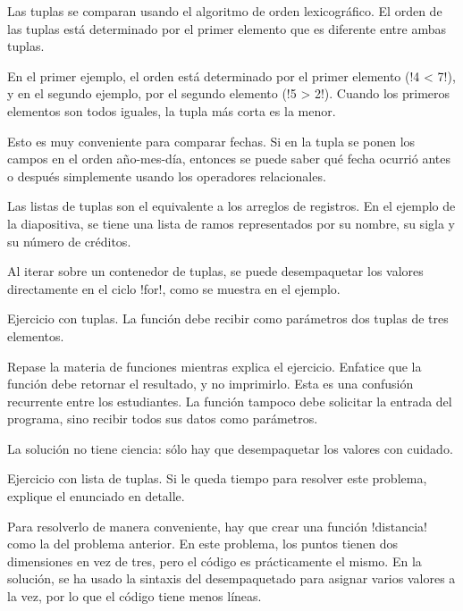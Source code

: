 \documentclass[10pt]{article}
\begin{document}
  Las tuplas se comparan usando el algoritmo de orden lexicográfico.
  El orden de las tuplas está determinado por el primer elemento
  que es diferente entre ambas tuplas.

  En el primer ejemplo,
  el orden está determinado por el primer elemento (\li!4 < 7!),
  y en el segundo ejemplo,
  por el segundo elemento (\li!5 > 2!).
  Cuando los primeros elementos son todos iguales,
  la tupla más corta es la menor.

  Esto es muy conveniente para comparar fechas.
  Si en la tupla se ponen los campos en el orden año-mes-día,
  entonces se puede saber qué fecha ocurrió antes o después
  simplemente usando los operadores relacionales.


  Las listas de tuplas son el equivalente a los arreglos de registros.
  En el ejemplo de la diapositiva,
  se tiene una lista de ramos representados por su nombre, su sigla y su número de créditos.

  Al iterar sobre un contenedor de tuplas,
  se puede desempaquetar los valores directamente en el ciclo \li!for!,
  como se muestra en el ejemplo.


  Ejercicio con tuplas. La función debe recibir como parámetros
  dos tuplas de tres elementos.

  Repase la materia de funciones mientras explica el ejercicio.
  Enfatice que la función debe retornar el resultado, y no imprimirlo.
  Esta es una confusión recurrente entre los estudiantes.
  La función tampoco debe solicitar la entrada del programa,
  sino recibir todos sus datos como parámetros.

  La solución no tiene ciencia:
  sólo hay que desempaquetar los valores con cuidado.


  Ejercicio con lista de tuplas.
  Si le queda tiempo para resolver este problema,
  explique el enunciado en detalle.

  Para resolverlo de manera conveniente,
  hay que crear una función \li!distancia!
  como la del problema anterior.
  En este problema, los puntos tienen dos dimensiones en vez de tres,
  pero el código es prácticamente el mismo.
  En la solución,
  se ha usado la sintaxis del desempaquetado para asignar
  varios valores a la vez, por lo que el código tiene menos líneas.
\end{document}
